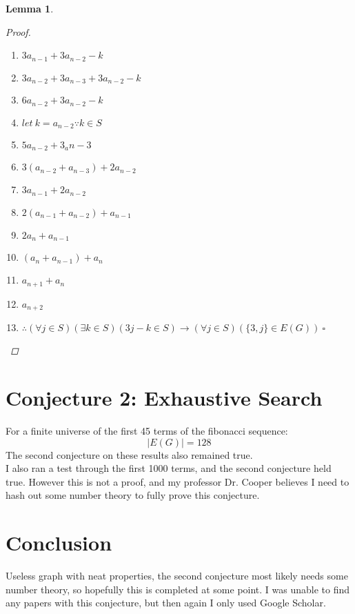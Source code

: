 \documentclass{article}
\newtheorem{lemma}[theorem]{Lemma}
\begin{document}
\begin{lemma}
\begin{proof}
\begin{enumerate}
        \item ${3a_{n-1}+3a_{n-2}-k}$
        \item ${3a_{n-2}+3a_{n-3}+3a_{n-2}-k}$
        \item ${6a_{n-2}+3a_{n-2}-k}$
        \item ${let\  k = a_{n-2}}\because k \in S$
        \item ${5a_{n-2}+3_a{n-3}}$
        \item ${3(a_{n-2}+a_{n-3})+2a_{n-2}}$
        \item ${3a_{n-1}+2a_{n-2}}$
        \item ${2(a_{n-1}+a_{n-2})+a_{n-1}}$
        \item ${2a_{n}+a_{n-1}}$
        \item ${(a_{n}+a_{n-1})+a_{n}}$
        \item ${a_{n+1} + a_{n}}$
        \item ${a_{n+2}}$
        \item $\therefore {(\forall j \in S)(\exists k \in S)(3j-k \in S)\rightarrow(\forall j\in S)(\{3,j\}\in E(G))}\ \square$
    \end{enumerate}
  \end{proof}
\end{lemma}

\section{Conjecture 2: Exhaustive Search}
For a finite universe of the first 45 terms of the fibonacci sequence:\\
\[|E(G)|=128\]
The second conjecture on these results also remained true.\\
I also ran a test through the first 1000 terms, and the second conjecture held true. However this is not a proof, and my professor Dr. Cooper believes I need to hash out some number theory to fully prove this conjecture.
\section{Conclusion}
Useless graph with neat properties, the second conjecture most likely needs some number theory, so hopefully this is completed at some point. I was unable to find any papers with this conjecture, but then again I only used Google Scholar.


\end{document}
